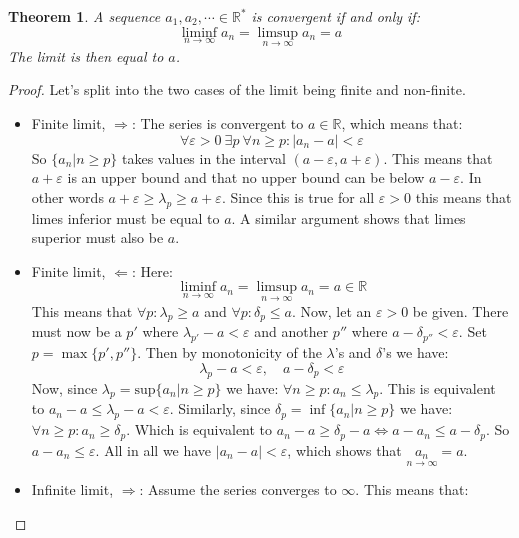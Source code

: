 \documentclass[12pt, a4paper]{article}
\newtheorem{theorem}{Theorem}[section]
\numberwithin{equation}{section}
\begin{document}
\begin{theorem}
\label{liminf_limsup}
A sequence $a_1,a_2,\cdots\in\mathbb{R}^*$ is convergent if and only if:
\begin{equation}
\liminf_{n\rightarrow\infty}a_n=\limsup_{n\rightarrow\infty}a_n=a
\end{equation}
The limit is then equal to $a$. 
\end{theorem}
\begin{proof}
Let's split into the two cases of the limit being finite and non-finite.
\begin{itemize}
\item Finite limit, $\Rightarrow$: The series is convergent to $a\in\mathbb{R}$, which means that:
\begin{equation}
\forall\varepsilon>0\ \exists p\ \forall n\ge p: |a_n-a|<\varepsilon
\end{equation}
So $\{a_n|n\ge p\}$ takes values in the interval $(a-\varepsilon,a+\varepsilon)$. This means that $a+\varepsilon$ is an upper bound and that no upper bound can be below $a-\varepsilon$. In other words $a+\varepsilon\ge\lambda_p\ge a+\varepsilon$. Since this is true for all $\varepsilon>0$ this means that limes inferior must be equal to $a$. A similar argument shows that limes superior must also be $a$.
\item Finite limit, $\Leftarrow$: Here:
\begin{equation}
\liminf_{n\rightarrow\infty}a_n=\limsup_{n\rightarrow\infty}a_n=a\in\mathbb{R}
\end{equation}
This means that $\forall p:\lambda_p\ge a$ and $\forall p:\delta_p\le a$. Now, let an $\varepsilon>0$ be given. There must now be a $p'$ where $\lambda_{p'}-a<\varepsilon$ and another $p''$ where $a-\delta_{p''}<\varepsilon$. Set $p=\max\{p',p''\}$. Then by monotonicity of the $\lambda$'s and $\delta$'s we have:
\begin{equation}
\lambda_p-a<\varepsilon,\quad a-\delta_p<\varepsilon
\end{equation}
Now, since $\lambda_p=\textrm{sup}\{a_n|n\ge p\}$ we have:
$\forall n\ge p: a_n\le\lambda_p$. This is equivalent to $a_n-a\le\lambda_p-a<\varepsilon$. Similarly, since $\delta_p=\inf\{a_n|n\ge p\}$ we have: $\forall n\ge p: a_n\ge\delta_p$. Which is equivalent to $a_n-a\ge\delta_p-a\Leftrightarrow a-a_n\le a-\delta_p$. So $a-a_n\le\varepsilon$. All in all we have $|a_n-a|<\varepsilon$, which shows that $\underset{n\rightarrow\infty}{a_n}=a$.
\item Infinite limit, $\Rightarrow$: Assume the series converges to $\infty$. This means that:

\end{itemize}
\end{proof}
\end{document}
